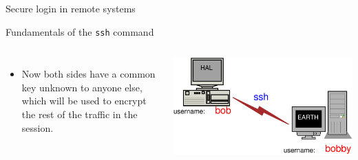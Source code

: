 \begin{frame}[t,fragile]{Secure login in remote systems}
\begin{block}{Fundamentals of the \alert{\texttt{ssh}} command}
\begin{columns}
{\begin{itemize}
        \item Now both sides have a \alert{common key} unknown to anyone else, which will be used to encrypt the rest of the traffic in the session.
        \end{itemize}
       \phantom{ ..}
      }
      \begin{center}
        \includegraphics[angle=0,width=\linewidth]{./Figs/Diagram2.eps}%
      \end{center}
    \end{columns}
  \end{block}
  
\end{frame}
